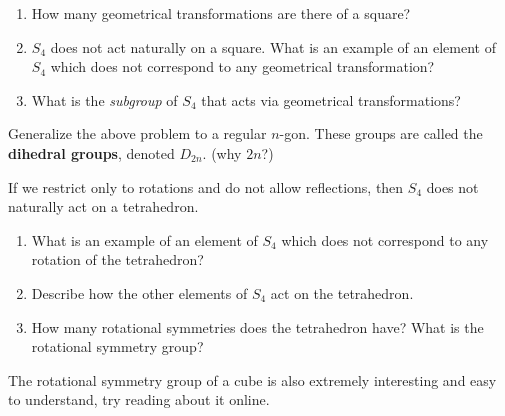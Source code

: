 \begin{questions}[resume]
  \item \begin{enumerate}
    \item How many geometrical transformations are there of a square?
    \item $ S_4$ does not act naturally on a square. What is an example of an element of $ S_4$ which does not correspond to any geometrical transformation?
    \item What is the \emph{subgroup} of $ S_4$ that acts via geometrical transformations?
  \end{enumerate}
  
  \item Generalize the above problem to a regular $ n$-gon. These groups are called the \textbf{dihedral groups}, denoted $ D_{2n}$. (why $ 2n$?)

  \item If we restrict only to rotations and do not allow reflections, then $ S_4$ does not naturally act on a tetrahedron.
  \begin{enumerate}
    \item What is an example of an element of $ S_4$ which does not correspond to any rotation of the tetrahedron?
    \item Describe how the other elements of $ S_4$ act on the tetrahedron.
    \item How many rotational symmetries does the tetrahedron have? What is the rotational symmetry group? 
  \end{enumerate}
\end{questions}

The rotational symmetry group of a cube is also extremely interesting and easy to understand, try reading about it online.

  
